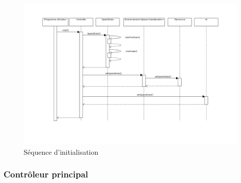 \begin{figure}[!h]\centering
   \includegraphics[scale=0.5]{images/seq_init.png}
   \caption{\label{seq_init} Séquence d'initialisation}
\end{figure}

%
\subsubsection{Contrôleur principal}

